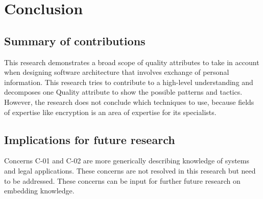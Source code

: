 \chapter{Conclusion}\label{s:conclusion}
\section{Summary of contributions}
This research demonstrates a broad scope of quality attributes to take in account when designing software architecture that involves exchange of personal information. This research tries to contribute to a high-level understanding and decomposes one Quality attribute to show the possible patterns and tactics. However, the research does not conclude which techniques to use, because fields of expertise like encryption is an area of expertise for its specialists.

\section{Implications for future research}
Concerns C-01 and C-02 are more generically describing knowledge of systems and legal applications. These concerns are not resolved in this research but need to be addressed. These concerns can be input for further future research on embedding knowledge.

\lipsum[1-1]

